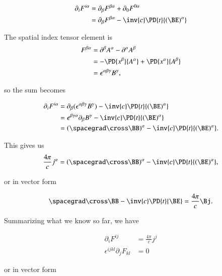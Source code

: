 \begin{align*}
\partial_i F^{i\alpha}
&= \partial_\beta F^{\beta \alpha} + \partial_0 F^{0 \alpha} \\
&= \partial_\beta F^{\beta \alpha} - \inv{c} \PD{t}{(\BE)^\alpha} \\
\end{align*}

The spatial index tensor element is
\begin{align*}
F^{\beta \alpha} 
&= 
\partial^\beta A^\alpha - \partial^\alpha A^\beta  \\
&= 
- \PD{x^\beta}{A^\alpha} + \PD{x^\alpha}{A^\beta} \\
&= 
\epsilon^{\alpha\beta\gamma} B^\gamma,
\end{align*}

so the sum becomes

\begin{align*}
\partial_i F^{i\alpha}
&= \partial_\beta ( \epsilon^{\alpha\beta\gamma} B^\gamma) - \inv{c} \PD{t}{(\BE)^\alpha} \\
&= 
\epsilon^{\beta\gamma\alpha} \partial_\beta B^\gamma - \inv{c} \PD{t}{(\BE)^\alpha} \\
&= 
(\spacegrad \cross \BB)^\alpha - \inv{c} \PD{t}{(\BE)^\alpha}.
\end{align*}

This gives us
\begin{equation}\label{eqn:relativisticElectrodynamicsL13:350}
\frac{4 \pi}{c} j^\alpha
= (\spacegrad \cross \BB)^\alpha - \inv{c} \PD{t}{(\BE)^\alpha},
\end{equation}

or in vector form

\begin{equation}\label{eqn:relativisticElectrodynamicsL13:370}
\spacegrad \cross \BB - \inv{c} \PD{t}{\BE} = \frac{4 \pi}{c} \Bj.
\end{equation}

Summarizing what we know so far, we have

\begin{equation}\label{eqn:relativisticElectrodynamicsL13:390}
\boxed{
\begin{aligned}
\partial_i F^{ij} &= \frac{4 \pi}{c} j^j \\
\epsilon^{ijkl} \partial_j F_{kl} &= 0
\end{aligned}
}
\end{equation}

or in vector form

